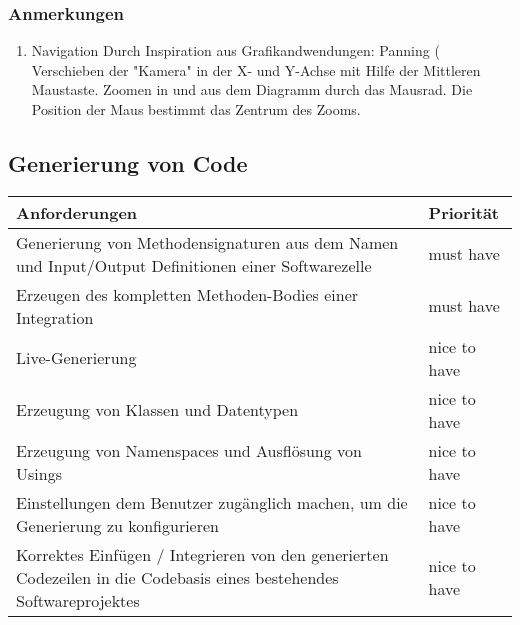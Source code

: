 \documentclass[11pt]{article}
\begin{document}
\subsubsection{Anmerkungen}
\label{sec:orgheadline10}
\begin{enumerate}
\item Navigation
\label{sec:orgheadline9}
Durch Inspiration aus Grafikandwendungen: Panning ( Verschieben der "Kamera" in
der X- und Y-Achse mit Hilfe der Mittleren Maustaste. Zoomen in und aus dem
Diagramm durch das Mausrad. Die Position der Maus bestimmt das Zentrum des
Zooms.
\end{enumerate}




\subsection{Generierung von Code}
\label{sec:orgheadline16}
\begin{center}
\begin{tabular}{ll}
Anforderungen & Priorität\\
\hline
Generierung von Methodensignaturen aus dem Namen und Input/Output Definitionen einer Softwarezelle & must have\\
Erzeugen des kompletten Methoden-Bodies einer Integration & must have\\
Live-Generierung & nice to have\\
Erzeugung von Klassen und Datentypen & nice to have\\
Erzeugung von Namenspaces und Ausflösung von Usings & nice to have\\
Einstellungen  dem Benutzer zugänglich machen, um die Generierung zu konfigurieren & nice to have\\
Korrektes Einfügen / Integrieren von den generierten Codezeilen in die Codebasis eines bestehendes Softwareprojektes & nice to have\\
\end{tabular}
\end{center}
\end{document}
